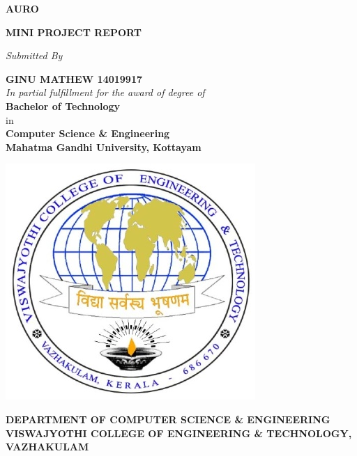 \documentclass[11pt]{report}
\begin{document}
\begin{titlepage}
    \begin{center}
        
\Huge
        \textbf{AURO}
        
        \vspace{1cm}
        \large \textbf{MINI PROJECT REPORT}
        
        \vspace{.4cm}
		\textit{Submitted By}
		
		\vspace{.4cm}      
        \large \textbf{GINU MATHEW \hspace{.5cm} 14019917}\\
        
        \vspace{.6cm}
        \textit{In partial fulfillment for the award of degree of} \\
        
        \vspace{.4cm}
        \large \textbf{Bachelor of Technology}\\
        \vspace{.4cm}
        in \\
        \vspace{.4cm}
        \large \textbf{Computer Science \& Engineering} \\
        \vspace{0.1cm}
		\large \textbf{Mahatma Gandhi University, Kottayam}
        
        \vspace{0.4cm}
        
        \includegraphics{vjcet.jpg}
                
        \vspace{0.4cm}
        
        \normalsize \textbf {DEPARTMENT OF COMPUTER SCIENCE \& ENGINEERING}\\
        \vspace{.4cm}
        \large \textbf {VISWAJYOTHI COLLEGE OF ENGINEERING \& TECHNOLOGY, VAZHAKULAM}
        
    \end{center}
\end{titlepage}
\end{document}
